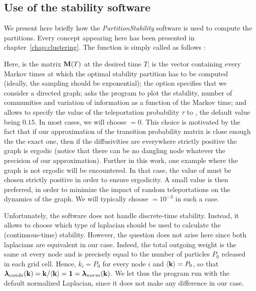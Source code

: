 \subsection{Use of the stability software}
We present here briefly how the \textit{PartitionStability} software is used to compute the partitions. Every concept appearing here has been presented in chapter~\ref{chap:clustering}. The  function is simply called as follows : \vspace{-.2cm}
\begin{center}
\end{center} %
Here,  is the matrix $\mathbf M(T)$ at the desired time $T$;  is the vector containing every Markov times at which the optimal stability partition has to be computed (ideally, the sampling should be exponential); the  option specifies that we consider a directed graph;  asks the program to plot the stability, number of communities and variation of information as a function of the Markov time; and  allows to specify the value of the teleportation probability $\tau$ to , the default value being $0.15$. In most cases, we will choose  $= 0$. This choice is motivated by the fact that if our approximation of the transition probability matrix is close enough the the exact one, then if the diffusivities are everywhere strictly positive the graph is ergodic (notice that there can be no dangling node whatever the precision of our approximation). Further in this work, one example where the graph is not ergodic will be encountered. In that case, the value of  must be chosen strictly positive in order to ensure ergodicity. A small value is then preferred, in order to minimize the impact of random teleportations on the dynamics of the graph. We will typically choose  $=10^{-3}$ in such a case.

Unfortunately, the software does not handle discrete-time stability. Instead, it allows to choose which type of laplacian should be used to calculate the (continuous-time) stability. However, the question does not arise here since both laplacians are equivalent in our case. Indeed, the total outgoing weight is the same at every node and is precisely equal to the number of particles $P_0$ released in each grid cell. Hence, $k_i = P_0$ for every node $i$ and $\langle \mathbf k \rangle = P_0$, so that $\boldsymbol \lambda_{combi}(\mathbf k) = \mathbf k/ \langle \mathbf k \rangle = \mathbf 1 = \boldsymbol \lambda_{norm}(\mathbf k)$. We let thus the program run with the default normalized Laplacian, since it does not make any difference in our case.

